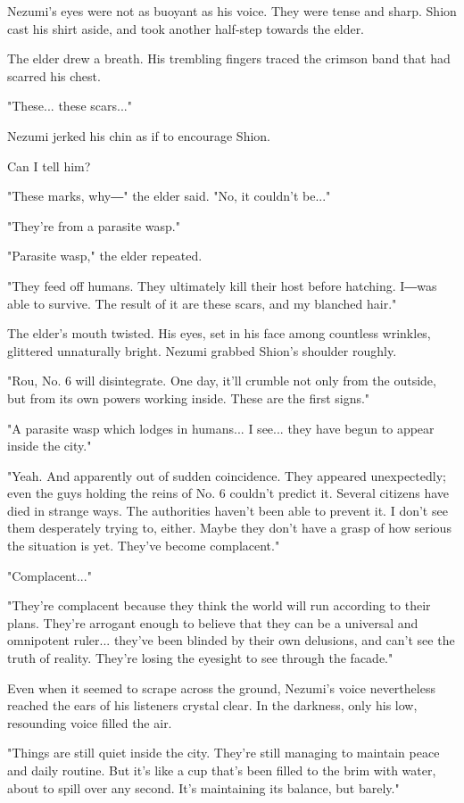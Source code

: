 Nezumi's eyes were not as buoyant as his voice. They were tense and
sharp. Shion cast his shirt aside, and took another half-step towards
the elder.

The elder drew a breath. His trembling fingers traced the crimson band
that had scarred his chest.

"These... these scars..."

Nezumi jerked his chin as if to encourage Shion.

Can I tell him?

"These marks, why―" the elder said. "No, it couldn't be..."

"They're from a parasite wasp."

"Parasite wasp," the elder repeated.

"They feed off humans. They ultimately kill their host before hatching.
I―was able to survive. The result of it are these scars, and my blanched
hair."

The elder's mouth twisted. His eyes, set in his face among countless
wrinkles, glittered unnaturally bright. Nezumi grabbed Shion's shoulder
roughly.

"Rou, No. 6 will disintegrate. One day, it'll crumble not only from the
outside, but from its own powers working inside. These are the first
signs."

"A parasite wasp which lodges in humans... I see... they have begun to
appear inside the city."

"Yeah. And apparently out of sudden coincidence. They appeared
unexpectedly; even the guys holding the reins of No. 6 couldn't predict
it. Several citizens have died in strange ways. The authorities haven't
been able to prevent it. I don't see them desperately trying to, either.
Maybe they don't have a grasp of how serious the situation is yet.
They've become complacent."

"Complacent..."

"They're complacent because they think the world will run according to
their plans. They're arrogant enough to believe that they can be a
universal and omnipotent ruler... they've been blinded by their own
delusions, and can't see the truth of reality. They're losing the
eyesight to see through the facade."

Even when it seemed to scrape across the ground, Nezumi's voice
nevertheless reached the ears of his listeners crystal clear. In the
darkness, only his low, resounding voice filled the air.

"Things are still quiet inside the city. They're still managing to
maintain peace and daily routine. But it's like a cup that's been filled
to the brim with water, about to spill over any second. It's maintaining
its balance, but barely."


